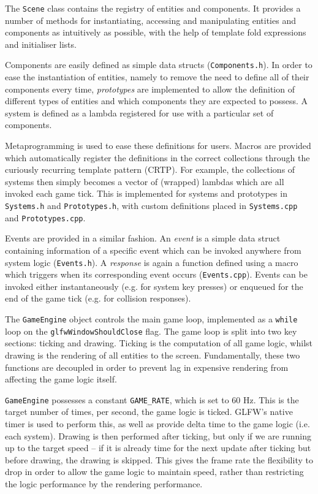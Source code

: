 \documentclass[a4paper, oneside, 11pt]{report}
\begin{document}
The \texttt{Scene} class contains the registry of entities and components. It provides a number of methods for instantiating, accessing and manipulating entities and components as intuitively as possible, with the help of template fold expressions and initialiser lists.

Components are easily defined as simple data structs (\texttt{Components.h}). In order to ease the instantiation of entities, namely to remove the need to define all of their components every time, \emph{prototypes} are implemented to allow the definition of different types of entities and which components they are expected to possess. A system is defined as a lambda registered for use with a particular set of components.

Metaprogramming is used to ease these definitions for users. Macros are provided which automatically register the definitions in the correct collections through the curiously recurring template pattern (CRTP). For example, the collections of systems then simply becomes a vector of (wrapped) lambdas which are all invoked each game tick. This is implemented for systems and prototypes in \texttt{Systems.h} and \texttt{Prototypes.h}, with custom definitions placed in \texttt{Systems.cpp} and \texttt{Prototypes.cpp}.

Events are provided in a similar fashion. An \emph{event} is a simple data struct containing information of a specific event which can be invoked anywhere from system logic (\texttt{Events.h}). A \emph{response} is again a function defined using a macro which triggers when its corresponding event occurs (\texttt{Events.cpp}). Events can be invoked either instantaneously (e.g. for system key presses) or enqueued for the end of the game tick (e.g. for collision responses).

The \texttt{GameEngine} object controls the main game loop, implemented as a \texttt{while} loop on the \texttt{glfwWindowShouldClose} flag. The game loop is split into two key sections: ticking and drawing. Ticking is the computation of all game logic, whilst drawing is the rendering of all entities to the screen. Fundamentally, these two functions are decoupled in order to prevent lag in expensive rendering from affecting the game logic itself.

\texttt{GameEngine} possesses a constant \texttt{GAME\_RATE}, which is set to 60 Hz. This is the target number of times, per second, the game logic is ticked. GLFW's native timer is used to perform this, as well as provide delta time to the game logic (i.e. each system). Drawing is then performed after ticking, but only if we are running up to the target speed -- if it is already time for the next update after ticking but before drawing, the drawing is skipped. This gives the frame rate the flexibility to drop in order to allow the game logic to maintain speed, rather than restricting the logic performance by the rendering performance.
\end{document}
